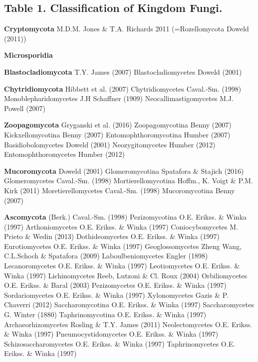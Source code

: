 \documentclass[]{book}
\begin{document}
\subsection{Table 1. Classification of Kingdom
Fungi.}\label{table-1.-classification-of-kingdom-fungi.}

\textbf{Cryptomycota} M.D.M. Jones \& T.A. Richards 2011 (=Rozellomycota
Doweld (2011))

\textbf{Microsporidia }

\textbf{Blastocladiomycota} T.Y. James (2007) Blastocladiomycetes Doweld
(2001)

\textbf{Chytridiomycota} Hibbett et al. (2007) Chytridiomycetes
Caval.-Sm. (1998) Monoblepharidomycetes J.H Schaffner (1909)
Neocallimastigomycetes M.J. Powell (2007)

\textbf{Zoopagomycota} Gryganski et al. (2016) Zoopagomycotina Benny
(2007) Kickxellomycotina Benny (2007) Entomophthoromycotina Humber
(2007) Basidiobolomycetes Doweld (2001) Neozygitomycetes Humber (2012)
Entomophthoromycetes Humber (2012)

\textbf{Mucoromycota} Doweld (2001) Glomeromycotina Spatafora \& Stajich
(2016) Glomeromycetes Caval.-Sm. (1998) Mortierellomycotina Hoffm., K.
Voigt \& P.M. Kirk (2011) Moretierellomycetes Caval.-Sm. (1998)
Mucoromycotina Benny (2007)

\textbf{Ascomycota} (Berk.) Caval.-Sm. (1998) Pezizomycotina O.E.
Erikss. \& Winka (1997) Arthoniomycetes O.E. Erikss. \& Winka (1997)
Coniocybomycetes M. Prieto \& Wedin (2013) Dothideomycetes O.E. Erikss.
\& Winka (1997) Eurotiomycetes O.E. Erikss. \& Winka (1997)
Geoglossomycetes Zheng Wang, C.L.Schoch \& Spatafora (2009)
Laboulbeniomycetes Engler (1898) Lecanoromycetes O.E. Erikss. \& Winka
(1997) Leotiomycetes O.E. Erikss. \& Winka (1997) Lichinomycetes Reeb,
Lutzoni \& Cl. Roux (2004) Orbiliomycetes O.E. Erikss. \& Baral (2003)
Pezizomycetes O.E. Erikss. \& Winka (1997) Sordariomycetes O.E. Erikss.
\& Winka (1997) Xylonomycetes Gazis \& P. Chaverri (2012)
Saccharomycotina O.E. Erikss. \& Winka (1997) Saccharomycetes G. Winter
(1880) Taphrinomycotina O.E. Erikss. \& Winka (1997) Archaeorhizomycetes
Rosling \& T.Y. James (2011) Neolectomycetes O.E. Erikss. \& Winka
(1997) Pneumocystidomycetes O.E. Erikss. \& Winka (1997)
Schizosaccharomycetes O.E. Erikss. \& Winka (1997) Taphrinomycetes O.E.
Erikss. \& Winka (1997)
\end{document}
